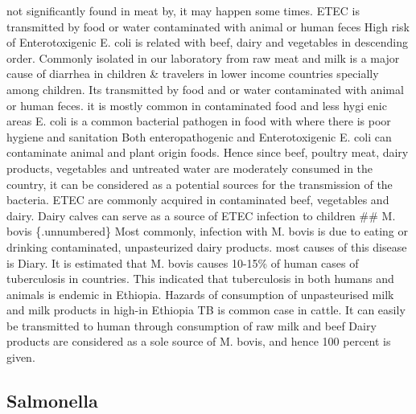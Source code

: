 \documentclass[
  letterpaper,
  DIV=11,
  numbers=noendperiod]{scrartcl}
\begin{document}
not significantly found in meat by, it may happen some times. ETEC is
transmitted by food or water contaminated with animal or human feces
High risk of Enterotoxigenic E. coli is related with beef, dairy and
vegetables in descending order. Commonly isolated in our laboratory from
raw meat and milk is a major cause of diarrhea in children \& travelers
in lower income countries specially among children. Its transmitted by
food and or water contaminated with animal or human feces. it is mostly
common in contaminated food and less hygi enic areas E. coli is a common
bacterial pathogen in food with where there is poor hygiene and
sanitation Both enteropathogenic and Enterotoxigenic E. coli can
contaminate animal and plant origin foods. Hence since beef, poultry
meat, dairy products, vegetables and untreated water are moderately
consumed in the country, it can be considered as a potential sources for
the transmission of the bacteria. ETEC are commonly acquired in
contaminated beef, vegetables and dairy. Dairy calves can serve as a
source of ETEC infection to children \#\# M. bovis \{.unnumbered\} Most
commonly, infection with M. bovis is due to eating or drinking
contaminated, unpasteurized dairy products. most causes of this disease
is Diary. It is estimated that M. bovis causes 10-15\% of human cases of
tuberculosis in countries. This indicated that tuberculosis in both
humans and animals is endemic in Ethiopia. Hazards of consumption of
unpasteurised milk and milk products in high-in Ethiopia TB is common
case in cattle. It can easily be transmitted to human through
consumption of raw milk and beef Dairy products are considered as a sole
source of M. bovis, and hence 100 percent is given.

\subsection*{Salmonella}\label{salmonella}
\end{document}
